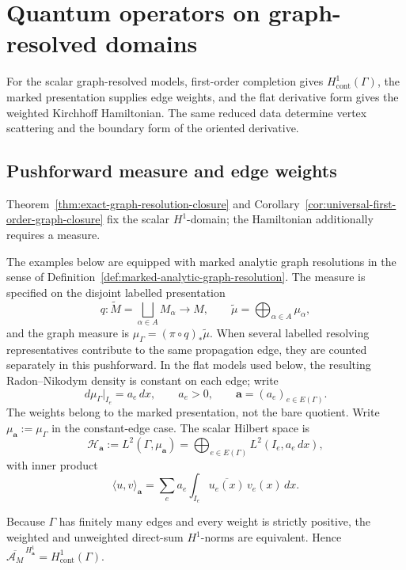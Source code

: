 \documentclass[11pt]{article}
\theoremstyle{plain}
\theoremstyle{definition}
\begin{document}
\section{Quantum operators on graph-resolved domains}
\label{sec:analytic-framework}

For the scalar graph-resolved models, first-order completion gives \(H^1_{\mathrm{cont}}(\Gamma)\), the marked presentation supplies edge weights, and the flat derivative form gives the weighted Kirchhoff Hamiltonian. The same reduced data determine vertex scattering and the boundary form of the oriented derivative.

\subsection{Pushforward measure and edge weights}
\label{subsec:graph-measure}

Theorem~\ref{thm:exact-graph-resolution-closure} and Corollary~\ref{cor:universal-first-order-graph-closure} fix the scalar \(H^1\)-domain; the Hamiltonian additionally requires a measure.

The examples below are equipped with marked analytic graph resolutions in
the sense of Definition~\ref{def:marked-analytic-graph-resolution}. The
measure is specified on the disjoint labelled presentation
\[
  q:\widetilde M=\bigsqcup_{\alpha\in A}M_\alpha\longrightarrow M,
  \qquad
  \widetilde\mu=\bigoplus_{\alpha\in A}\mu_\alpha,
\]
and the graph measure is
\(\mu_\Gamma=(\pi\circ q)_*\widetilde\mu\).
When several labelled resolving representatives contribute to the same
propagation edge, they are counted separately in this pushforward. In the
flat models used below, the resulting Radon--Nikodym density is constant on
each edge; write
\[
  d\mu_\Gamma|_{I_e}=a_e\,dx,
  \qquad
  a_e>0,
  \qquad
  \mathbf a=(a_e)_{e\in E(\Gamma)}.
\]
The weights belong to the marked presentation, not the bare quotient. Write \(\mu_{\mathbf a}:=\mu_\Gamma\)
in the constant-edge case. The scalar Hilbert space is
\[
  \mathcal H_{\mathbf a}
  :=
  L^2(\Gamma,\mu_{\mathbf a})
  =
  \bigoplus_{e\in E(\Gamma)}
  L^2(I_e,a_e\,dx),
\]
with inner product
\[
  \langle u,v\rangle_{\mathbf a}
  =
  \sum_{e}
  a_e
  \int_{I_e}
  \overline{u_e(x)}\,v_e(x)\,dx.
\]

Because \(\Gamma\) has finitely many edges and every weight is strictly
positive, the weighted and unweighted direct-sum \(H^1\)-norms are
equivalent. Hence
\(\overline{\mathscr A_M}^{\,H^1_{\mathbf a}} = H^1_{\mathrm{cont}}(\Gamma)\).
\end{document}
